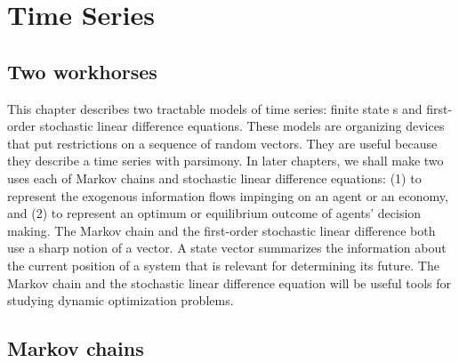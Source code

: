 %
%


\chapter{Time Series\label{timeseries}}
\def\toone{{t+1}}
\def\ttwo{{t+2}}
\def\tthree{{t+3}}
\def\Tone{{T+1}}
\def\TTT{{T-1}}
\def\rtr{{\rm tr}}
%
\def\frac#1#2{#1\over #2}
%

\section{Two workhorses}
  This chapter describes two tractable models
of time series: finite state s and   first-order
stochastic linear difference equations.   These models are
organizing devices that  put    restrictions on a
sequence of random vectors.  They are useful because they describe
a time series  with parsimony. In later chapters, we shall  make
two uses each of Markov chains and stochastic linear difference
equations: (1) to represent the exogenous information flows
impinging on an agent or an economy, and (2) to represent an
optimum or equilibrium outcome of agents' decision making.
The Markov chain and the first-order stochastic linear difference
both use a sharp  notion of a  vector.  A state vector
summarizes the information about the current position of a system that
is relevant for determining its future.
The Markov chain and the stochastic linear difference equation
will   be useful tools   for studying dynamic optimization
problems.

\section{Markov chains}

